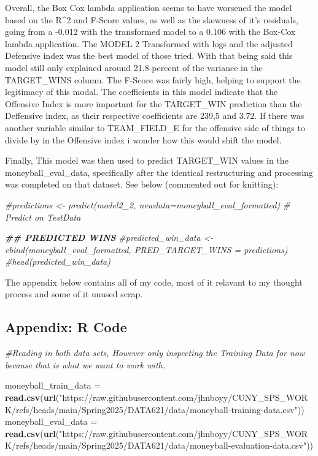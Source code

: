\documentclass[
]{article}
\newenvironment{Shaded}{\begin{snugshade}}{\end{snugshade}}
\newcommand{\CommentTok}[1]{\textcolor[rgb]{0.56,0.35,0.01}{\textit{#1}}}
\newcommand{\DocumentationTok}[1]{\textcolor[rgb]{0.56,0.35,0.01}{\textbf{\textit{#1}}}}
\newcommand{\FunctionTok}[1]{\textcolor[rgb]{0.13,0.29,0.53}{\textbf{#1}}}
\newcommand{\NormalTok}[1]{#1}
\newcommand{\OtherTok}[1]{\textcolor[rgb]{0.56,0.35,0.01}{#1}}
\newcommand{\StringTok}[1]{\textcolor[rgb]{0.31,0.60,0.02}{#1}}
\begin{document}
Overall, the Box Cox lambda application seems to have worsened the model
based on the R\^{}2 and F-Score values, as well as the skewness of it's
residuals, going from a -0.012 with the transformed model to a 0.106
with the Box-Cox lambda application. The MODEL 2 Transformed with logs
and the adjusted Defensive index was the best model of those tried. With
that being said this model still only explained around 21.8 percent of
the variance in the TARGET\_WINS column. The F-Score was fairly high,
helping to support the legitimacy of this modal. The coefficients in
this model indicate that the Offensive Index is more important for the
TARGET\_WIN prediction than the Deffensive index, as their respective
coefficients are 239,5 and 3.72. If there was another variable similar
to TEAM\_FIELD\_E for the offensive side of things to divide by in the
Offensive index i wonder how this would shift the model.

Finally, This model was then used to predict TARGET\_WIN values in the
moneyball\_eval\_data, specifically after the identical restructuring
and processing was completed on that dataset. See below (commented out
for knitting):

\begin{Shaded}
\begin{Highlighting}[]
\CommentTok{\#predictions \textless{}{-} predict(model2\_2, newdata=moneyball\_eval\_formatted)  \# Predict on TestData}

\DocumentationTok{\#\# PREDICTED WINS}
\CommentTok{\#predicted\_win\_data \textless{}{-} cbind(moneyball\_eval\_formatted, PRED\_TARGET\_WINS = predictions)}
\CommentTok{\#head(predicted\_win\_data)}
\end{Highlighting}
\end{Shaded}

The appendix below contains all of my code, most of it relavant to my
thought process and some of it unused scrap.

\subsection{Appendix: R Code}\label{appendix-r-code}

\begin{Shaded}
\begin{Highlighting}[]
\CommentTok{\#Reading in both data sets, However only inspecting the Training Data for now because that is what we want to work with. }

\NormalTok{moneyball\_train\_data }\OtherTok{=} \FunctionTok{read.csv}\NormalTok{(}\FunctionTok{url}\NormalTok{(}\StringTok{"https://raw.githubusercontent.com/jhnboyy/CUNY\_SPS\_WORK/refs/heads/main/Spring2025/DATA621/data/moneyball{-}training{-}data.csv"}\NormalTok{))}
\NormalTok{moneyball\_eval\_data }\OtherTok{=} \FunctionTok{read.csv}\NormalTok{(}\FunctionTok{url}\NormalTok{(}\StringTok{"https://raw.githubusercontent.com/jhnboyy/CUNY\_SPS\_WORK/refs/heads/main/Spring2025/DATA621/data/moneyball{-}evaluation{-}data.csv"}\NormalTok{))}
\end{Highlighting}
\end{Shaded}
\end{document}
